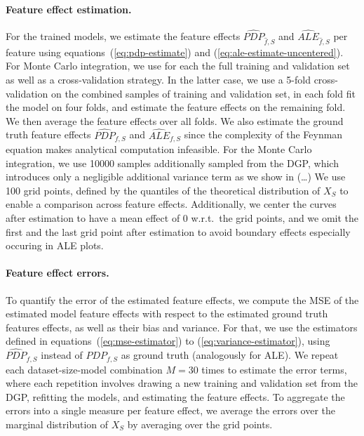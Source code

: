 \documentclass[runningheads]{llncs}
\begin{document}
\paragraph{Feature effect estimation.}
For the trained models, we estimate the feature effects $\widehat{PDP}_{\hat
        f,S}$ and $\widehat{ALE}_{\hat f,S}$ per feature using
equations~(\ref{eq:pdp-estimate}) and (\ref{eq:ale-estimate-uncentered}). For
Monte Carlo integration, we use for each the full training and validation set
as well as a cross-validation strategy. In the latter case, we use a 5-fold
cross-validation on the combined samples of training and validation set, in
each fold fit the model on four folds, and estimate the feature effects on the
remaining fold. We then average the feature effects over all folds. We also
estimate the ground truth feature effects $\widehat{PDP}_{f,S}$ and
$\widehat{ALE}_{f,S}$ since the complexity of the Feynman equation makes
analytical computation infeasible. For the Monte Carlo integration, we use
10000 samples additionally sampled from the DGP, which introduces only a
negligible additional variance term as we show in (\dots) We use 100 grid
points, defined by the quantiles of the theoretical distribution of $X_S$ to
enable a comparison across feature effects. Additionally, we center the curves
after estimation to have a mean effect of $0$ w.r.t.\ the grid points, and we
omit the first and the last grid point after estimation to avoid boundary
effects especially occuring in ALE plots.

\paragraph{Feature effect errors.} To quantify the error of the estimated feature effects, we compute the MSE of
the estimated model feature effects with respect to the estimated ground truth
features effects, as well as their bias and variance. For that, we use the
estimators defined in equations~(\ref{eq:mse-estimator}) to
(\ref{eq:variance-estimator}), using $\widehat{PDP}_{f,S}$ instead of
$PDP_{f,S}$ as ground truth (analogously for ALE). We repeat each
dataset-size-model combination $M=30$ times to estimate the error terms, where
each repetition involves drawing a new training and validation set from the
DGP, refitting the models, and estimating the feature effects. To aggregate the
errors into a single measure per feature effect, we average the errors over the
marginal distribution of $X_S$ by averaging over the grid points.
\end{document}
